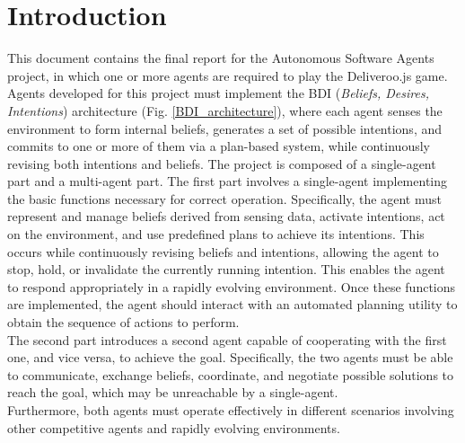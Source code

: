 
\section{Introduction}
    This document contains the final report for the Autonomous Software Agents project, in which one or more agents are required to play the Deliveroo.js game. Agents developed for this project must implement the BDI (\textit{Beliefs, Desires, Intentions}) architecture (Fig. \ref{BDI_architecture}), where each agent senses the environment to form internal beliefs, generates a set of possible intentions, and commits to one or more of them via a plan-based system, while continuously revising both intentions and beliefs.
    The project is composed of a single-agent part and a multi-agent part. The first part involves a single-agent implementing the basic functions necessary for correct operation. Specifically, the agent must represent and manage beliefs derived from sensing data, activate intentions, act on the environment, and use predefined plans to achieve its intentions. This occurs while continuously revising beliefs and intentions, allowing the agent to stop, hold, or invalidate the currently running intention. This enables the agent to respond appropriately in a rapidly evolving environment. Once these functions are implemented, the agent should interact with an automated planning utility to obtain the sequence of actions to perform.
    \medskip\\      
    The second part introduces a second agent capable of cooperating with the first one, and vice versa, to achieve the goal. Specifically, the two agents must be able to communicate, exchange beliefs, coordinate, and negotiate possible solutions to reach the goal, which may be unreachable by a single-agent.
    \medskip\\
    Furthermore, both agents must operate effectively in different scenarios involving other competitive agents and rapidly evolving environments.

